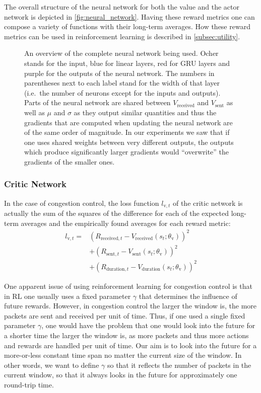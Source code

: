 \documentclass[sigconf]{acmart}
\begin{document}
The overall structure of the neural network for both the value and the actor network is depicted in \autoref{fig:neural_network}. Having these reward metrics one can compose a variety of functions with their long-term averages. How these reward metrics can be used in reinforcement learning is described in \autoref{subsec:utility}. 

\begin{figure}



\caption{An overview of the complete neural network being used. Ocher stands for the input, blue for linear layers, red for GRU layers and purple for the outputs of the neural network. The numbers in parentheses next to each label stand for the width of that layer (i.e.~the number of neurons except for the inputs and outputs). Parts of the neural network are shared between $V_\text{received}$ and $V_\text{sent}$ as well as $\mu$ and $\sigma$ as they output similar quantities and thus the gradients that are computed when updating the neural network are of the same order of magnitude. In our experiments we saw that if one uses shared weights between very different outputs, the outputs which produce significantly larger gradients would ``overwrite'' the gradients of the smaller ones.}
\label{fig:neural_network}
\end{figure}

\subsubsection{Critic Network}
\label{subsubsec:critic}

In the case of congestion control, the loss function $l_{\text{v},t}$ of the critic network is actually the sum of the squares of the difference for each of the expected long-term averages and the empirically found averages for each reward metric:
\begin{align*}
l_{\text{v},t} =& \left(R_{\text{received},t} - V_\text{received}(s_t; \theta_\text{v})\right)^2 \\
&+\left(R_{\text{sent},t} - V_\text{sent}(s_t; \theta_\text{v})\right)^2 \\
&+\left(R_{\text{duration},t} - V_\text{duration}(s_t; \theta_\text{v})\right)^2
\end{align*}

One apparent issue of using reinforcement learning for congestion control is that in RL one usually uses a fixed parameter $\gamma$ that determines the influence of future rewards. However, in congestion control the larger the window is, the more packets are sent and received per unit of time. Thus, if one used a single fixed parameter $\gamma$, one would have the problem that one would look into the future for a shorter time the larger the window is, as more packets and thus more actions and rewards are handled per unit of time. Our aim is to look into the future for a more-or-less constant time span no matter the current size of the window. In other words, we want to define $\gamma$ so that it reflects the number of packets in the current window, so that it always looks in the future for approximately one round-trip time. 
\end{document}
